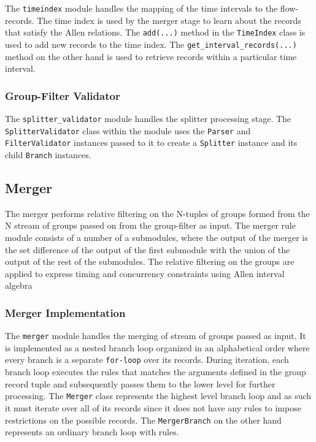 The \texttt{timeindex} module handles the mapping of the time intervals to the flow-records. The time index is used by the merger stage to learn about the records that satisfy the Allen relations. The \texttt{add(...)} method in the \texttt{TimeIndex} class is used to add new records to the time index. The \texttt{get\_interval\_records(...)} method on the other hand is used to retrieve records within a particular time interval.

\subsubsection{Group-Filter Validator}\label{subsubsec:group-filter-validator}
The \texttt{splitter\_validator} module handles the splitter processing stage.
The \texttt{SplitterValidator} class within the module uses the \texttt{Parser} and \texttt{FilterValidator} instances passed to it to create a \texttt{Splitter} instance and its child \texttt{Branch} instances.

\subsection{Merger}\label{subsec:merger}
The merger performs relative filtering on the N-tuples of groups formed from the N stream of groups passed on from the group-filter as input. The merger rule module consists of a number of a submodules, where the output of the merger is the set difference of the output of the first submodule with the union of the output of the rest of the submodules. The relative filtering on the groups are applied to express timing and concurrency constraints using Allen interval algebra \cite{fallen:1983}

\subsubsection{Merger Implementation}\label{subsubsec:merger-impl}
The \texttt{merger} module handles the merging of stream of groups passed as input. It is implemented as a nested branch loop organized in an alphabetical order where every branch is a separate \texttt{for-loop} over its records. During iteration, each branch loop executes the rules that matches the arguments defined in the group record tuple and subsequently passes them to the lower level for further processing. The \texttt{Merger} class represents the highest level branch loop and as such it must iterate over all of its records since it does not have any rules to impose restrictions on the possible records. The \texttt{MergerBranch} on the other hand represents an ordinary branch loop with rules.

